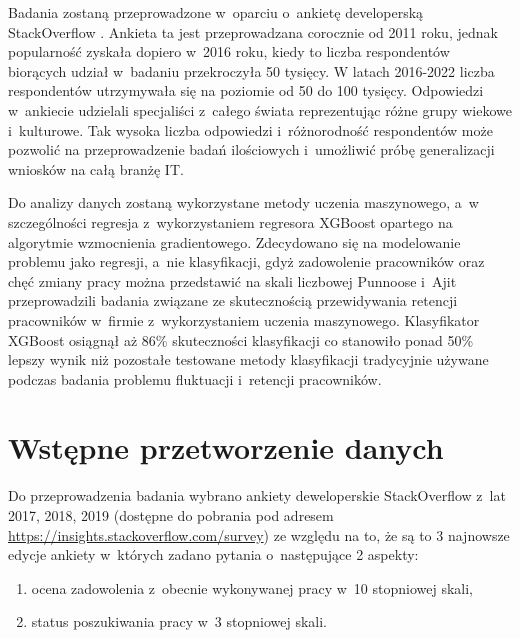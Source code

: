 Badania zostaną przeprowadzone w~oparciu o~ankietę developerską StackOverflow \cite{so-survey-info}.
Ankieta ta jest przeprowadzana corocznie od 2011 roku, jednak popularność zyskała dopiero w~2016 roku, kiedy to liczba respondentów biorących udział w~badaniu przekroczyła 50 tysięcy.
W latach 2016-2022 liczba respondentów utrzymywała się na poziomie od 50 do 100 tysięcy.
Odpowiedzi w~ankiecie udzielali specjaliści z~całego świata reprezentując różne grupy wiekowe i~kulturowe.
Tak wysoka liczba odpowiedzi i~różnorodność respondentów może pozwolić na przeprowadzenie badań ilościowych i~umożliwić próbę generalizacji wniosków na całą branżę IT.


Do analizy danych zostaną wykorzystane metody uczenia maszynowego, a~w szczególności regresja z~wykorzystaniem regresora XGBoost opartego na algorytmie wzmocnienia gradientowego.
Zdecydowano się na modelowanie problemu jako regresji, a~nie klasyfikacji, gdyż zadowolenie pracowników oraz chęć zmiany pracy można przedstawić na skali liczbowej
Punnoose i~Ajit \cite{punnoose-2016} przeprowadzili badania związane ze skutecznością przewidywania retencji pracowników w~firmie z~wykorzystaniem uczenia maszynowego.
Klasyfikator XGBoost osiągnął aż 86\% skuteczności klasyfikacji co stanowiło ponad 50\% lepszy wynik niż pozostałe testowane metody klasyfikacji tradycyjnie używane podczas badania problemu fluktuacji i~retencji pracowników.

\section{Wstępne przetworzenie danych}\label{sec:analysis:preprocessing}
Do przeprowadzenia badania wybrano ankiety deweloperskie StackOverflow z~lat 2017, 2018, 2019 (dostępne do pobrania pod adresem \url{https://insights.stackoverflow.com/survey}) ze względu na to, że są to 3 najnowsze edycje ankiety w~których zadano pytania o~następujące 2 aspekty:
\begin{enumerate}
    \item ocena zadowolenia z~obecnie wykonywanej pracy w~10 stopniowej skali,
    \item status poszukiwania pracy w~3 stopniowej skali.
    \end{enumerate}

